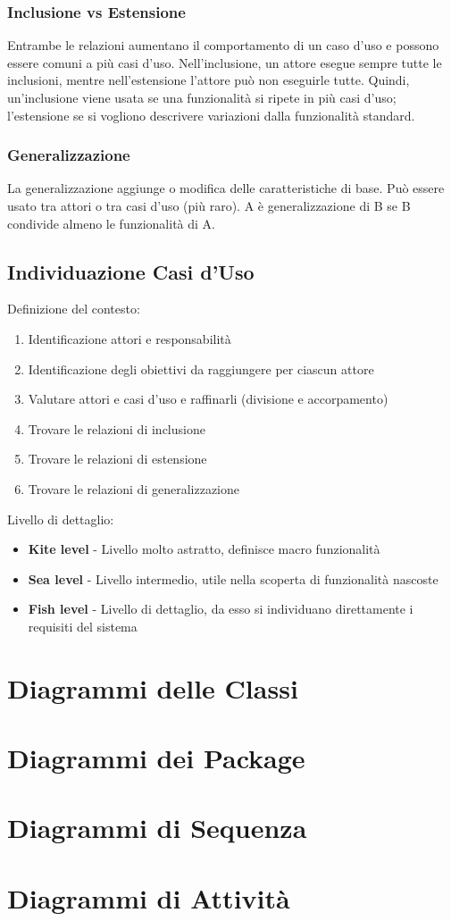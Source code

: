\subsubsection{Inclusione vs Estensione}
Entrambe le relazioni aumentano il comportamento di un caso d'uso e possono essere comuni a più casi d'uso. 
Nell'inclusione, un attore esegue sempre tutte le inclusioni, mentre nell'estensione l'attore può non eseguirle tutte.
Quindi, un'inclusione viene usata se una funzionalità si ripete in più casi d'uso; 
l'estensione se si vogliono descrivere variazioni dalla funzionalità standard. 

\subsubsection{Generalizzazione}
La generalizzazione aggiunge o modifica delle caratteristiche di base. 
Può essere usato tra attori o tra casi d'uso (più raro). 
A è generalizzazione di B se B condivide almeno le funzionalità di A.

\subsection{Individuazione Casi d'Uso}

Definizione del contesto:
\begin{enumerate}
\item Identificazione attori e responsabilità
\item Identificazione degli obiettivi da raggiungere per ciascun attore
\item Valutare attori e casi d'uso e raffinarli (divisione e accorpamento)
\item Trovare le relazioni di inclusione
\item Trovare le relazioni di estensione
\item Trovare le relazioni di generalizzazione
\end{enumerate}
Livello di dettaglio:
\begin{itemize}
\item \textbf{Kite level} - Livello molto astratto, definisce macro funzionalità
\item \textbf{Sea level} - Livello intermedio, utile nella scoperta di funzionalità nascoste
\item \textbf{Fish level} - Livello di dettaglio, da esso si individuano direttamente i requisiti del sistema
\end{itemize}

\section{Diagrammi delle Classi}


\section{Diagrammi dei Package}


\section{Diagrammi di Sequenza}
\section{Diagrammi di Attività}